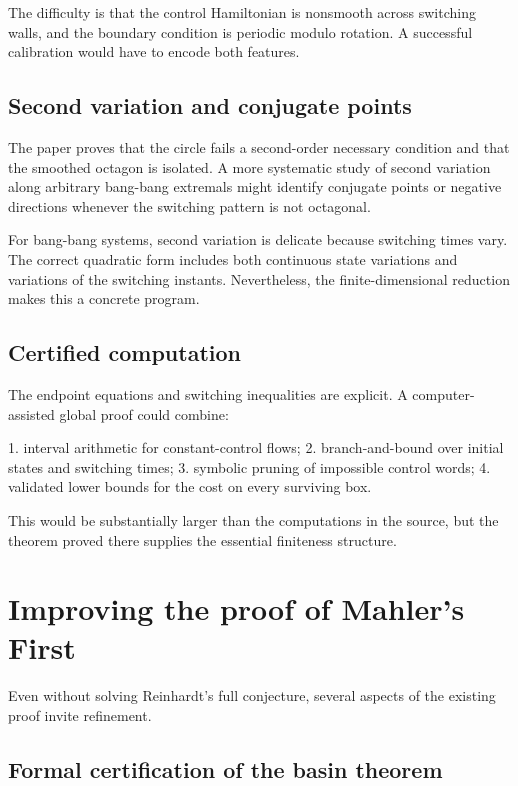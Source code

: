 The difficulty is that the control Hamiltonian is nonsmooth across switching walls, and the boundary condition is periodic modulo rotation. A successful calibration would have to encode both features.


\subsection{Second variation and conjugate points}

The paper proves that the circle fails a second-order necessary condition and that the smoothed octagon is isolated. A more systematic study of second variation along arbitrary bang-bang extremals might identify conjugate points or negative directions whenever the switching pattern is not octagonal.


For bang-bang systems, second variation is delicate because switching times vary. The correct quadratic form includes both continuous state variations and variations of the switching instants. Nevertheless, the finite-dimensional reduction makes this a concrete program.


\subsection{Certified computation}

The endpoint equations and switching inequalities are explicit. A computer-assisted global proof could combine:


1. interval arithmetic for constant-control flows; 2. branch-and-bound over initial states and switching times; 3. symbolic pruning of impossible control words; 4. validated lower bounds for the cost on every surviving box.


This would be substantially larger than the computations in the source, but the theorem proved there supplies the essential finiteness structure.


\section{Improving the proof of Mahler’s First}

Even without solving Reinhardt’s full conjecture, several aspects of the existing proof invite refinement.


\subsection{Formal certification of the basin theorem}

